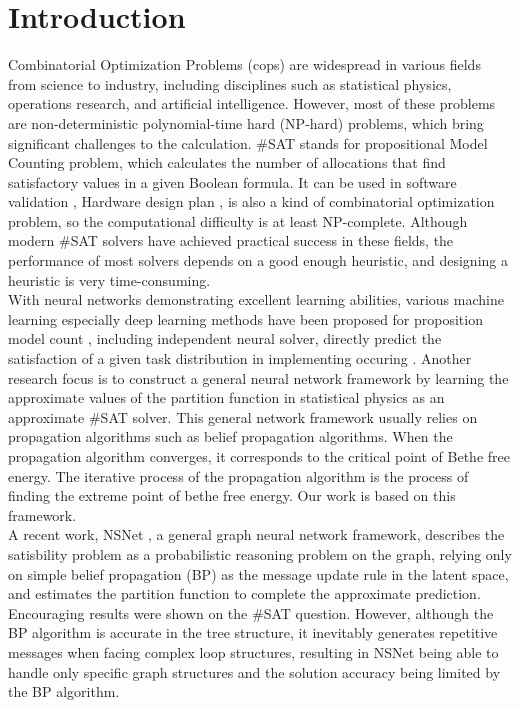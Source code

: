 \section{Introduction}

Combinatorial Optimization Problems (cops) are widespread in various fields from science to industry, 
including disciplines such as statistical physics, operations research, and artificial intelligence. 
However, most of these problems are non-deterministic polynomial-time hard (NP-hard) problems, which 
bring significant challenges to the calculation. \#SAT stands for propositional Model Counting problem, 
which calculates the number of allocations that find satisfactory values in a given Boolean formula. 
It can be used in software validation \cite {DBLP:journals/fmsd/ClarkeBRZ01} \cite {DBLP:journals/tcs/IvancicYGGA08}, 
Hardware design plan \cite{DBLP:conf/dac/SilvaS00}\cite{DBLP:conf/fmcad/SheeranSS00}\cite{DBLP:conf/aips/DomshlakH06}, 
is also a kind of combinatorial optimization problem, so the computational difficulty is at least 
NP-complete. Although modern \#SAT solvers have achieved practical success in these fields, the 
performance of most solvers depends on a good enough heuristic, and designing a heuristic is very 
time-consuming. \\

With neural networks demonstrating excellent learning abilities, various machine learning especially deep 
learning methods have been proposed for proposition model count \cite{DBLP:conf/aaai/VaezipoorLWMGSB21}
\cite{Atkari_2019_10} \cite{DBLP:conf/ijcnn/OzolinsFDGZK22}, including independent neural solver, directly 
predict the satisfaction of a given task distribution in implementing occuring \cite{DBLP:conf/iclr/AmizadehMW19} 
\cite{DBLP:journals/corr/abs-1903-01969}. Another research focus is to construct a general neural network 
framework by learning the approximate values of the partition function in statistical physics as an 
approximate \#SAT solver. This general network framework usually relies on propagation algorithms such 
as belief propagation algorithms\cite{DBPL:Kirkley_2020}\cite{DBPL:Bouttier_2024}. When the propagation 
algorithm converges, it corresponds to the critical point of Bethe free energy. The iterative process of 
the propagation algorithm is the process of finding the extreme point of bethe free energy. Our work is 
based on this framework. \\

A recent work, NSNet \cite{DBLP:conf/nips/LiS22}, a general graph neural network framework, describes the 
satisbility problem as a probabilistic reasoning problem on the graph, relying only on simple belief propagation 
(BP) as the message update rule in the latent space, and estimates the partition function to complete the 
approximate prediction. Encouraging results were shown on the \#SAT question. However, although the BP algorithm 
is accurate in the tree structure, it inevitably generates repetitive messages when facing complex loop structures, 
resulting in NSNet being able to handle only specific graph structures and the solution accuracy being limited by 
the BP algorithm. \\

